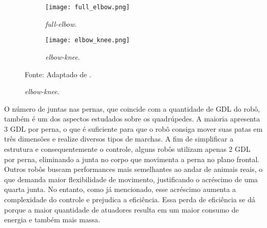 \documentclass[../main.tex]{subfiles}
\begin{document}
\begin{figure}[h]
  \centering
  \caption{Tipos de configuração de pernas para robôs com estrutura tipo mamífero.}
  \begin{subfigure}[t]{0.24\textwidth}
    \centering
    \texttt{[image: full\_elbow.png]}
    \caption{\textit{full-elbow}.}
    \label{fig:joint_configurations_a}
  \end{subfigure}
  \begin{subfigure}[t]{0.24\textwidth}
    \centering
    \texttt{[image: elbow\_knee.png]}
    \caption{\textit{elbow-knee}.}
    \label{fig:joint_configurations_d}
  \end{subfigure}

  Fonte: Adaptado de \cite{Yao2021}.
  \label{fig:joint_configurations}
\end{figure}

O número de juntas nas pernas, que coincide com a quantidade de GDL do robô, também é um dos aspectos estudados sobre os quadrúpedes. A maioria apresenta 3 GDL por perna, o que é suficiente para que o robô consiga mover suas patas em três dimensões e realize diversos tipos de marchas. A fim de simplificar a estrutura e consequentemente o controle, alguns robôs utilizam apenas 2 GDL por perna, eliminando a junta no corpo que movimenta a perna no plano frontal. Outros robôs buscam performances mais semelhantes ao andar de animais reais, o que demanda maior flexibilidade de movimento, justificando o acréscimo de uma quarta junta. No entanto, como já mencionado, esse acréscimo aumenta a complexidade do controle e prejudica a eficiência. Essa perda de eficiência se dá porque a maior quantidade de atuadores resulta em um maior consumo de energia e também mais massa.
\end{document}
